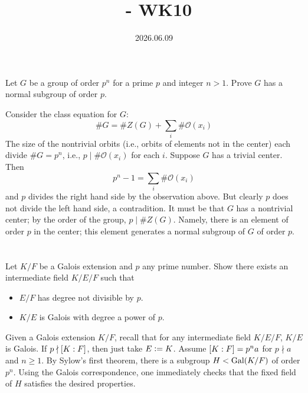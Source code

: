 \documentclass[12pt]{article}
\title{\course\ - WK10}
\author{\myname}
\date{2026.06.09}
\begin{document}
\maketitle
\thispagestyle{fancy}



\section{} 
Let $G$ be a group of order $p^n$ for a prime $p$ and integer $n > 1$. 
Prove $G$ has a normal subgroup of order $p$. 

\noindent \dotfill 

Consider the class equation for $G$: 
$$\#G = \#Z(G) + \sum_i \# \mathcal{O}(x_i)$$
The size of the nontrivial orbits (i.e., orbits of elements not in the center) each divide $\#G = p^n$, i.e., 
$p \mid \#\mathcal{O}(x_i)$ for each $i$. 
Suppose $G$ has a trivial center. 
Then 
$$p^n - 1 = \sum_{i} \# \mathcal{O}(x_i)$$
and $p$ divides the right hand side by the observation above. 
But clearly $p$ does not divide the left hand side, a contradition. 
It must be that $G$ has a nontrivial center; 
by the order of the group, $p \mid \#Z(G)$. 
Namely, there is an element of order $p$ in the center; 
this element generates a normal subgroup of $G$ of order $p$. 

\section{} 
Let $K / F$ be a Galois extension and $p$ any prime number. 
Show there exists an intermediate field $K / E / F$ such that 
\begin{itemize}
  \item $E / F$ has degree not divisible by $p$. 
  \item $K / E$ is Galois with degree a power of $p$. 
\end{itemize}

\noindent \dotfill 

Given a Galois extension $K / F$, recall that for any intermediate field $K / E / F$, $K / E$ is Galois. 
If $p \nmid [K : F]$, then just take $E \vcentcolon= K$. 
Assume $[K : F] = p^n a$ for $p \nmid a$ and $n \geq 1$. 
By Sylow's first theorem, there is a subgroup $H < \text{Gal}(K / F)$ of order $p^n$. 
Using the Galois correspondence, one immediately checks that the fixed field of $H$ satisfies the desired properties. 
\end{document}
